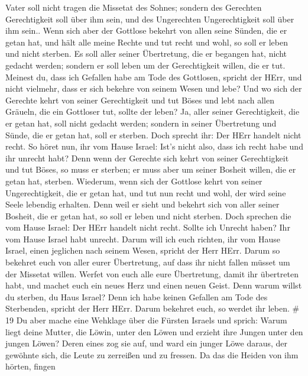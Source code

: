 Vater soll nicht tragen die Missetat des Sohnes; sondern des Gerechten
Gerechtigkeit soll über ihm sein, und des Ungerechten Ungerechtigkeit
soll über ihm sein..  Wenn sich aber der Gottlose bekehrt
von allen seine Sünden, die er getan hat, und hält alle meine Rechte und
tut recht und wohl, so soll er leben und nicht sterben.  Es
soll aller seiner Übertretung, die er begangen hat, nicht gedacht
werden; sondern er soll leben um der Gerechtigkeit willen, die er tut.
 Meinest du, dass ich Gefallen habe am Tode des Gottlosen,
spricht der HErr, und nicht vielmehr, dass er sich bekehre von seinem
Wesen und lebe?  Und wo sich der Gerechte kehrt von seiner
Gerechtigkeit und tut Böses und lebt nach allen Gräueln, die ein
Gottloser tut, sollte der leben? Ja, aller seiner Gerechtigkeit, die er
getan hat, soll nicht gedacht werden; sondern in seiner Übertretung und
Sünde, die er getan hat, soll er sterben.  Doch sprecht
ihr: Der HErr handelt nicht recht. So höret nun, ihr vom Hause Israel:
Ist's nicht also, dass ich recht habe und ihr unrecht habt?
 Denn wenn der Gerechte sich kehrt von seiner Gerechtigkeit
und tut Böses, so muss er sterben; er muss aber um seiner Bosheit
willen, die er getan hat, sterben.  Wiederum, wenn sich der
Gottlose kehrt von seiner Ungerechtigkeit, die er getan hat, und tut nun
recht und wohl, der wird seine Seele lebendig erhalten. 
Denn weil er sieht und bekehrt sich von aller seiner Bosheit, die er
getan hat, so soll er leben und nicht sterben.  Doch
sprechen die vom Hause Israel: Der HErr handelt nicht recht. Sollte ich
Unrecht haben? Ihr vom Hause Israel habt unrecht.  Darum
will ich euch richten, ihr vom Hause Israel, einen jeglichen nach seinem
Wesen, spricht der Herr HErr. Darum so bekehret euch von aller eurer
Übertretung, auf dass ihr nicht fallen müsset um der Missetat willen.
 Werfet von euch alle eure Übertretung, damit ihr
übertreten habt, und machet euch ein neues Herz und einen neuen Geist.
Denn warum willst du sterben, du Haus Israel?  Denn ich
habe keinen Gefallen am Tode des Sterbenden, spricht der Herr HErr.
Darum bekehret euch, so werdet ihr leben. \# 19  Du aber
mache eine Wehklage über die Fürsten Israels  und sprich:
Warum liegt deine Mutter, die Löwin, unter den Löwen und erzieht ihre
Jungen unter den jungen Löwen?  Deren eines zog sie auf, und
ward ein junger Löwe daraus, der gewöhnte sich, die Leute zu zerreißen
und zu fressen.  Da das die Heiden von ihm hörten, fingen
